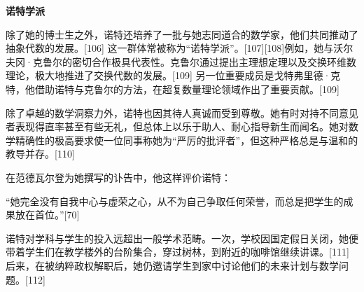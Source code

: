\textbf{诺特学派}

除了她的博士生之外，诺特还培养了一批与她志同道合的数学家，他们共同推动了抽象代数的发展。[106] 这一群体常被称为“诺特学派”。[107][108]例如，她与沃尔夫冈·克鲁尔的密切合作极具代表性。克鲁尔通过提出主理想定理以及交换环维数理论，极大地推进了交换代数的发展。[109] 另一位重要成员是戈特弗里德·克特，他借助诺特与克鲁尔的方法，在超复数量理论领域作出了重要贡献。[109]

除了卓越的数学洞察力外，诺特也因其待人真诚而受到尊敬。她有时对持不同意见者表现得直率甚至有些无礼，但总体上以乐于助人、耐心指导新生而闻名。她对数学精确性的极高要求使一位同事称她为“严厉的批评者”，但这种严格总是与温和的教导并存。[110]

在范德瓦尔登为她撰写的讣告中，他这样评价诺特：

“她完全没有自我中心与虚荣之心，从不为自己争取任何荣誉，而总是把学生的成果放在首位。”[70]

诺特对学科与学生的投入远超出一般学术范畴。一次，学校因国定假日关闭，她便带着学生们在教学楼外的台阶集合，穿过树林，到附近的咖啡馆继续讲课。[111] 后来，在被纳粹政权解职后，她仍邀请学生到家中讨论他们的未来计划与数学问题。[112]
